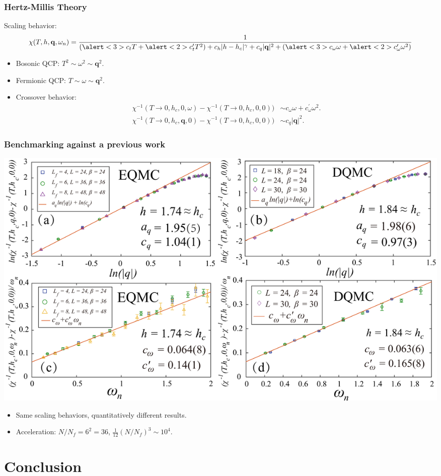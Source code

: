 \documentclass[xcolor=table, 10pt, aspectratio=43]{beamer}
\begin{document}
\begin{frame}
  \frametitle{Hertz-Millis Theory}
  Scaling behavior:
\[\chi(T,h,\mathbf{q},\omega_n)=
\frac{1}{(\alert<3>{c_{t}T}+\alert<2>{c_{t}' T^{2}})
+c_{h}|h-h_c|^{\gamma}+c_q|\mathbf{q}|^2
+ (\alert<3>{c_{\omega}\omega}+\alert<2>{c'_{\omega}\omega^{2}})}\]
\begin{itemize}
  \item<2-> Bosonic QCP: $T^2\sim\omega^2\sim \bm q^2$.
  \item<3-> Fermionic QCP: $T\sim\omega\sim \bm q^2$.
  \item<4-> Crossover behavior:
  \begin{align*}
    \chi^{-1}(T\rightarrow0,h_c,0,\omega)-\chi^{-1}(T\rightarrow0,h_c,0,0))
    &\sim c_\omega\omega + c_\omega^\prime\omega^2.\\
    \chi^{-1}(T\rightarrow0,h_c,\bm q,0)-\chi^{-1}(T\rightarrow0,h_c,0,0))
    &\sim c_q|\bm q|^2.
  \end{align*}
\end{itemize}
\end{frame}

\begin{frame}
  \frametitle{Benchmarking against a previous work}
  \begin{center}
    \includegraphics[width=\textwidth]{chiwqanalysis.pdf}
  \end{center}
\begin{itemize}
  \item Same scaling behaviors, quantitatively different results.
  \item Acceleration: $N/N_f=6^2=36$, $\frac1{12}(N/N_f)^3 \sim 10^4$.
\end{itemize}
\end{frame}

\section{Conclusion}
\end{document}
